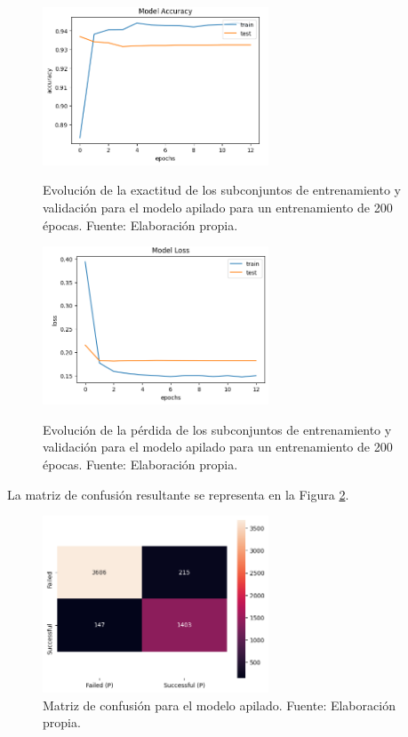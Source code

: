 \begin{figure}[htbp]
	\begin{center}
		\includegraphics[width=0.60\textwidth]{4/figures/stacked_model_accuracy.png}
		\caption{Evolución de la exactitud de los subconjuntos de entrenamiento y validación para el modelo apilado para un entrenamiento de 200 épocas. Fuente: Elaboración propia.}
		\label{5:fig13}
		\includegraphics[width=0.60\textwidth]{4/figures/stacked_model_loss.png}
		\caption{Evolución de la pérdida de los subconjuntos de entrenamiento y validación para el modelo apilado para un entrenamiento de 200 épocas. Fuente: Elaboración propia.}
		\label{5:fig14}
	\end{center}
\end{figure}

La matriz de confusión resultante se representa en la Figura \ref{5:fig15}.
\begin{figure}[!ht]
	\begin{center}
		\includegraphics[width=0.60\textwidth]{4/figures/stacked_confusion_matrix.png}
		\caption{Matriz de confusión para el modelo apilado. Fuente: Elaboración propia.}
		\label{5:fig15}
	\end{center}
\end{figure}

